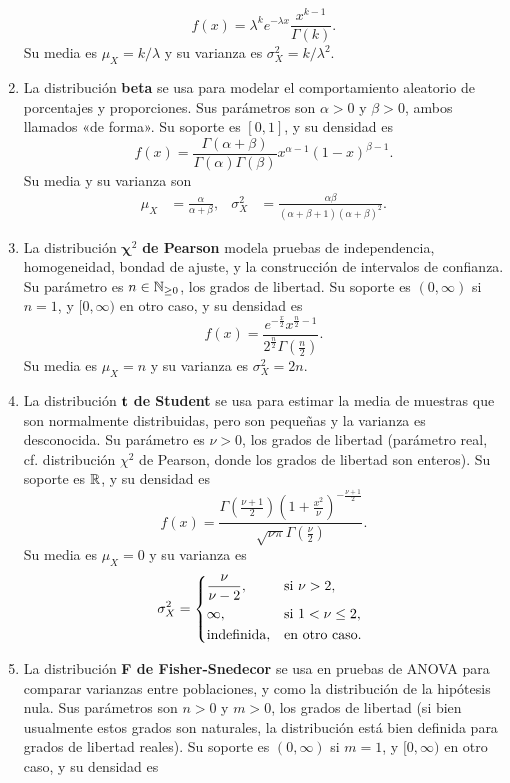 \begin{enumerate}
	\[f(x) = \lambda^k e^{-\lambda x}\frac{x^{k-1}}{\Gamma(k)}.\]
	Su media es \(\mu_X = k / \lambda\) y su varianza es \(\sigma_X^2 = k / \lambda^2\).
	\item La distribución \textbf{beta} se usa para modelar el comportamiento aleatorio de porcentajes y proporciones. Sus parámetros son \(\alpha > 0\) y \(\beta > 0\), ambos llamados «de forma». Su soporte es \([0, 1]\), y su densidad es
	\[f(x) = \frac{\Gamma(\alpha + \beta)}{\Gamma(\alpha) \Gamma(\beta)} x^{\alpha-1}(1-x)^{\beta-1}.\]
	Su media y su varianza son
	\begin{align*}
		\mu_X	&= \frac{\alpha}{\alpha + \beta},	& \sigma^2_X	&= \frac{\alpha\beta}{(\alpha+\beta+1)(\alpha + \beta)^2}.
	\end{align*}
	\item La distribución \(\boldsymbol{\chi}^2\) \textbf{de Pearson} modela pruebas de independencia, homogeneidad, bondad de ajuste, y la construcción de intervalos de confianza. Su parámetro es \(n \in \mathbb{N}_{\geq 0}\), los grados de libertad. Su soporte es \((0, \infty)\) si \(n = 1\), y \([0, \infty)\) en otro caso, y su densidad es
	\[f(x) = \frac{e^{-\frac{x}{2}} x^{\frac{n}{2}-1}}{2^{\frac{n}{2}} \Gamma(\frac{n}{2})}.\]
	Su media es \(\mu_X = n\) y su varianza es \(\sigma^2_X = 2n\).
	\item La distribución \(\mathbf{t}\) \textbf{de Student} se usa para estimar la media de muestras que son normalmente distribuidas, pero son pequeñas y la varianza es desconocida. Su parámetro es \(\nu > 0\), los grados de libertad (parámetro real, cf. distribución \(\chi^2\) de Pearson, donde los grados de libertad son enteros). Su soporte es \(\mathbb{R}\), y su densidad es
	\[f(x) = \frac{\Gamma(\frac{\nu+1}{2}) (1 + \frac{x^2}{\nu})^{-\frac{\nu + 1}{2}}}{\sqrt{\nu \pi} \Gamma(\frac{\nu}{2})}.\]
	Su media es \(\mu_X = 0\) y su varianza es
	\[\sigma^2_X = \begin{dcases*}
		\frac{\nu}{\nu - 2},	& si \(\nu > 2\),\\
		\infty,					& si \(1 < \nu \leq 2\),\\
		\text{indefinida},		& en otro caso.
	\end{dcases*}\]
	\item La distribución \textbf{F de Fisher-Snedecor} se usa en pruebas de ANOVA para comparar varianzas entre poblaciones, y como la distribución de la hipótesis nula. Sus parámetros son \(n > 0\) y \(m > 0\), los grados de libertad (si bien usualmente estos grados son naturales, la distribución está bien definida para grados de libertad reales). Su soporte es \((0, \infty)\) si \(m = 1\), y \([0, \infty)\) en otro caso, y su densidad es

\end{enumerate}
